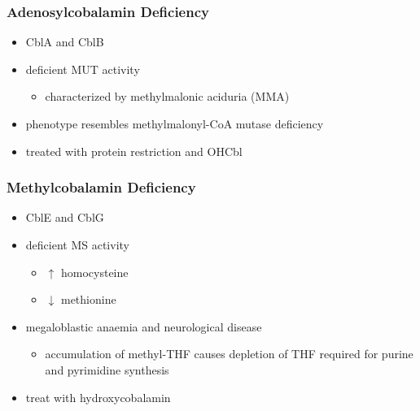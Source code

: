 \documentclass[12pt]{scrartcl}
\begin{document}
\subsubsection{Adenosylcobalamin Deficiency}
\label{sec:orge04a1f2}
\begin{itemize}
\item CblA and CblB
\item deficient MUT activity
\begin{itemize}
\item characterized by methylmalonic aciduria (MMA)
\end{itemize}
\item phenotype resembles methylmalonyl-CoA mutase deficiency
\item treated with protein restriction and OHCbl
\end{itemize}

\subsubsection{Methylcobalamin Deficiency}
\label{sec:org1bc660f}
\begin{itemize}
\item CblE and CblG
\item deficient MS activity
\begin{itemize}
\item \(\uparrow\) homocysteine
\item \(\downarrow\) methionine
\end{itemize}
\item megaloblastic anaemia and neurological disease
\begin{itemize}
\item accumulation of methyl-THF causes depletion of THF required for
purine and pyrimidine synthesis
\end{itemize}
\item treat with hydroxycobalamin
\end{itemize}
\end{document}
